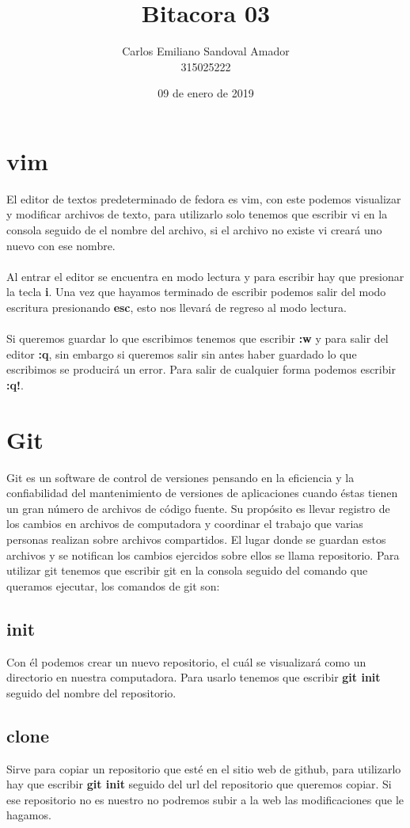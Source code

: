 \documentclass[letterpaper, 12pt, oneside]{article}%
\title{Bitacora 03}
\author{Carlos Emiliano Sandoval Amador \\ 315025222}
\date{09 de enero de 2019}
\begin{document}
	\maketitle
	\section{vim}
	El editor de textos predeterminado de fedora es vim, con este podemos visualizar y modificar archivos de texto, para utilizarlo solo tenemos que escribir vi en la consola seguido de el nombre del archivo, si el archivo no existe vi creará uno nuevo con ese nombre.\\ \\ Al entrar el editor se encuentra en modo lectura y para escribir hay que presionar la tecla \textbf{i}. Una vez que hayamos terminado de escribir podemos salir del modo escritura presionando \textbf{esc}, esto nos llevará de regreso al modo lectura.\\ \\ Si queremos guardar lo que escribimos tenemos que escribir \textbf{:w} y para salir del editor \textbf{:q}, sin embargo si queremos salir sin antes haber guardado lo que escribimos se producirá un error. Para salir de cualquier forma podemos escribir \textbf{:q!}.
	\section{Git}
	{Git es un software de control de versiones pensando en la eficiencia y la confiabilidad del mantenimiento de versiones de aplicaciones cuando éstas tienen un gran número de archivos de código fuente. Su propósito es llevar registro de los cambios en archivos de computadora y coordinar el trabajo que varias personas realizan sobre archivos compartidos. El lugar donde se guardan estos archivos y se notifican los cambios ejercidos sobre ellos se llama repositorio.}
	{Para utilizar git tenemos que escribir git en la consola seguido del comando que queramos ejecutar, los comandos de git son:}
	\subsection{init}
	{Con él podemos crear un nuevo repositorio, el cuál se visualizará como un directorio en nuestra computadora. Para usarlo tenemos que escribir \textbf{git init} seguido del nombre del repositorio.}
	\subsection{clone}
	{Sirve para copiar un repositorio que esté en el sitio web de github, para utilizarlo hay que escribir \textbf{git init} seguido del url del repositorio que queremos copiar. Si ese repositorio no es nuestro no podremos subir a la web las modificaciones que le hagamos.}
\end{document}
